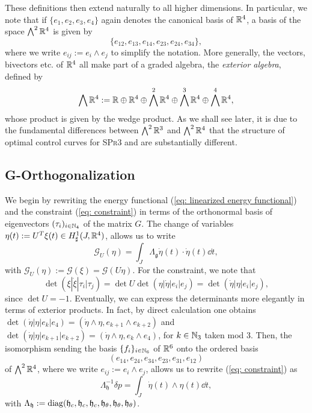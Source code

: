 These definitions then extend naturally to all higher dimensions. In particular, we note that if $\{e_1, e_2, e_3, e_4\}$ again denotes the canonical basis of $\mathbb{R}^4$, a basis of the space $\bigwedge^2 \mathbb{R}^4$ is given by
\begin{equation}
\{e_{12}, e_{13}, e_{14}, e_{23}, e_{24}, e_{34}\},
\end{equation}
where we write $e_{ij} := e_i \wedge e_j$ to simplify the notation. More generally, the vectors, bivectors etc. of $\mathbb{R}^4$ all make part of a graded algebra, the \emph{exterior algebra}, defined by
\begin{equation}
\bigwedge \mathbb{R}^4 := \mathbb{R} \oplus \mathbb{R}^4 \oplus \bigwedge^2\mathbb{R}^4 \oplus \bigwedge^3 \mathbb{R}^4 \oplus \bigwedge^4 \mathbb{R}^4,
\end{equation}
whose product is given by the wedge product. As we shall see later, it is due to the fundamental differences between $\bigwedge^2 \mathbb{R}^3$ and $\bigwedge^2 \mathbb{R}^4$ that the structure of optimal control curves for \textsc{SPr3} and \spr are substantially different.


\subsection{G-Orthogonalization}
We begin by rewriting the energy functional (\ref{eq: linearized energy functional}) and the constraint (\ref{eq: constraint}) in terms of the orthonormal basis of eigenvectors $(\tau_i)_{i \in \mathbb{N}_4}$ of the matrix $G$. The change of variables $\eta(t) := U^T \xi(t) \in H_{\sharp}^{1}(J, \mathbb{R}^4)$, allows us to write
\begin{equation}
\label{eq: G-orth energy functional}
\mathcal{G}_{U}(\eta) = \int_{J} \Lambda_{\mathfrak{g}} \dot{\eta}(t) \cdot \dot{\eta}(t) \dd t,
\end{equation}
with $\mathcal{G}_{U}(\eta) := \mathcal{G}(\xi) = \mathcal{G}(U \eta)$. For the constraint, we note that
\begin{equation}
\det(\xi |\dot{\xi} | \tau_i | \tau_j) =  \det U \det (\eta | \dot{\eta} | e_i | e_j) = \det(\dot{\eta} | \eta | e_i |e_j),
\end{equation}
since $\det U = -1$. Eventually, we can express the determinants more elegantly in terms of exterior products. In fact, by direct calculation one obtains $\det(\dot{\eta} | \eta | e_k |e_4) = (\dot{\eta} \wedge \eta, e_{k + 1} \wedge e_{k+2})$ and $\det(\dot{\eta} |\eta | e_{k + 1} |e_{k + 2}) = (\dot{\eta} \wedge \eta, e_k \wedge e_4)$, for $k \in \mathbb{N}_3$ taken mod 3. Then, the isomorphism sending the basis $\{f_i\}_{i \in \mathbb{N}_6}$ of $\mathbb{R}^6$ onto the ordered basis 
\begin{equation}
\label{eq: basis of bivectors}
(e_{14}, e_{24}, e_{34}, e_{23}, e_{31}, e_{12})
\end{equation}
of $\bigwedge^2 \mathbb{R}^4$, where we write $e_{ij} := e_i \wedge e_j$, allows us to rewrite (\ref{eq: constraint}) as
\begin{equation}
\label{eq: G-orth constraint}
\Lambda_{\mathfrak{h}}^{-1} \delta p = \int_{J} \dot{\eta}(t) \wedge\eta(t) \dd t,
\end{equation}
with $\Lambda_{\mathfrak{h}} := \operatorname{diag}(\mathfrak{h}_{c}, \mathfrak{h}_{c}, \mathfrak{h}_{c}, \mathfrak{h}_{\theta}, \mathfrak{h}_{\theta}, \mathfrak{h}_{\theta})$.

